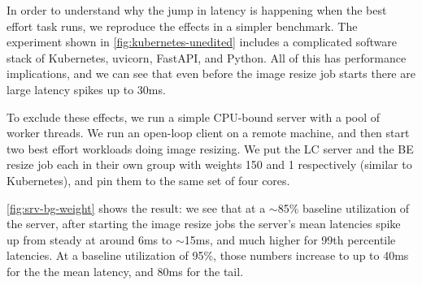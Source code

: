 In order to understand why the jump in latency is happening when the best effort
task runs, we reproduce the effects in a simpler benchmark. The experiment shown
in \autoref{fig:kubernetes-unedited} includes a complicated software stack of
Kubernetes, uvicorn, FastAPI, and Python. All of this has performance
implications, and we can see that even before the image resize job starts there
are large latency spikes up to 30ms.

To exclude these effects, we run a simple CPU-bound server with a pool of worker
threads. We run an open-loop client on a remote machine, and then start two best
effort workloads doing image resizing. We put the LC server and the BE resize
job each in their own \cgroups{} group with weights 150 and 1 respectively
(similar to Kubernetes), and pin them to the same set of four cores.

\autoref{fig:srv-bg-weight} shows the result: we see that at a $\sim$85\%
baseline utilization of the server, after starting the image resize jobs the
server's mean latencies spike up from steady at around 6ms to $\sim$15ms, and
much higher for 99th percentile latencies. At a baseline utilization of 95\%,
those numbers increase to up to 40ms for the the mean latency, and 80ms for the
tail.

